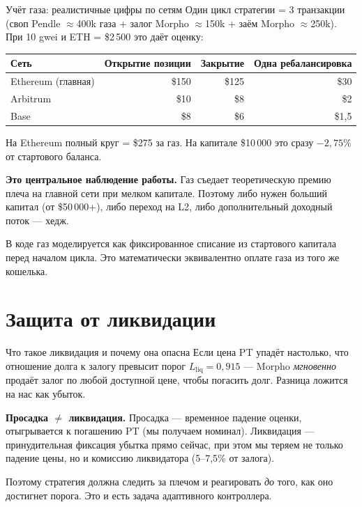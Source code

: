 \documentclass[11pt,aspectratio=169]{beamer}
\begin{document}
\begin{frame}{Учёт газа: реалистичные цифры по сетям}
  Один цикл стратегии = 3 транзакции (своп Pendle $\approx$400k газа +
  залог Morpho $\approx$150k + заём Morpho $\approx$250k). При 10 gwei и
  ETH = \$2\,500 это даёт оценку:

  \vspace{0.4em}
  \footnotesize
  \begin{tabular}{lrrr}
    \toprule
    Сеть & Открытие позиции & Закрытие & Одна ребалансировка \\
    \midrule
    Ethereum (главная)  & \$150 & \$125 & \$30 \\
    Arbitrum            &  \$10 &   \$8 &  \$2 \\
    Base                &   \$8 &   \$6 & \$1{,}5 \\
    \bottomrule
  \end{tabular}

  \vspace{0.7em}
  \normalsize
  На Ethereum полный круг = \$275 за газ. На капитале \$10\,000 это сразу
  $-2{,}75\%$ от стартового баланса.

  \vspace{0.4em}
  \textbf{Это центральное наблюдение работы.} Газ съедает теоретическую
  премию плеча на главной сети при мелком капитале. Поэтому либо нужен
  больший капитал (от \$50\,000+), либо переход на L2, либо дополнительный
  доходный поток --- хедж.

  \vspace{0.4em}
  В коде газ моделируется как фиксированное списание из стартового
  капитала перед началом цикла. Это математически эквивалентно оплате
  газа из того же кошелька.
\end{frame}

\section{Защита от ликвидации}

\begin{frame}{Что такое ликвидация и почему она опасна}
  Если цена PT упадёт настолько, что отношение долга к залогу
  превысит порог $L_{\text{liq}} = 0{,}915$ --- Morpho \emph{мгновенно}
  продаёт залог по любой доступной цене, чтобы погасить долг. Разница
  ложится на нас как убыток.

  \vspace{0.4em}
  \textbf{Просадка $\ne$ ликвидация.} Просадка --- временное падение
  оценки, отыгрывается к погашению PT (мы получаем номинал). Ликвидация ---
  принудительная фиксация убытка прямо сейчас, при этом мы теряем не только
  падение цены, но и комиссию ликвидатора (5--7{,}5\% от залога).

  \vspace{0.4em}
  Поэтому стратегия должна следить за плечом и реагировать \emph{до}
  того, как оно достигнет порога. Это и есть задача адаптивного контроллера.
\end{frame}
\end{document}

